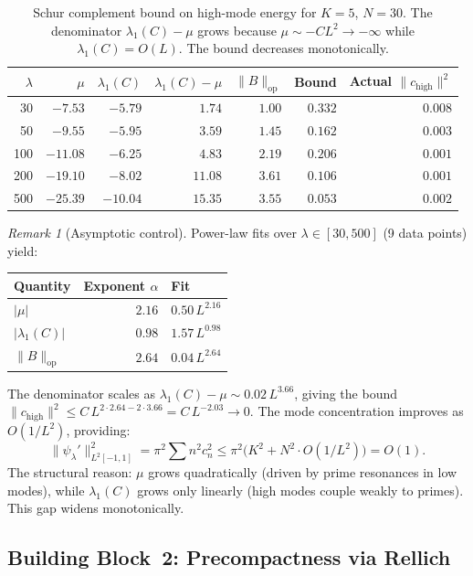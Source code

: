 \documentclass[12pt,a4paper]{article}
\theoremstyle{definition}
\theoremstyle{remark}
\newtheorem{remark}[theorem]{Remark}
\begin{document}
\begin{table}[h]
\centering
\renewcommand{\arraystretch}{1.15}
\begin{tabular}{r|r|r|r|r|r|r}
$\lambda$ & $\mu$ & $\lambda_1(C)$ & $\lambda_1(C) - \mu$ & $\|B\|_{\mathrm{op}}$ & Bound & Actual $\|c_{\mathrm{high}}\|^2$ \\\hline
30  & $-7.53$  & $-5.79$ & $1.74$  & $1.00$ & $0.332$ & $0.008$ \\
50  & $-9.55$  & $-5.95$ & $3.59$  & $1.45$ & $0.162$ & $0.003$ \\
100 & $-11.08$ & $-6.25$ & $4.83$  & $2.19$ & $0.206$ & $0.001$ \\
200 & $-19.10$ & $-8.02$ & $11.08$ & $3.61$ & $0.106$ & $0.001$ \\
500 & $-25.39$ & $-10.04$ & $15.35$ & $3.55$ & $0.053$ & $0.002$
\end{tabular}
\caption{Schur complement bound on high-mode energy for $K = 5$, $N = 30$. The denominator $\lambda_1(C) - \mu$ grows because $\mu \sim -CL^2 \to -\infty$ while $\lambda_1(C) = O(L)$. The bound decreases monotonically.}
\label{tab:schur}
\end{table}

\begin{remark}[Asymptotic control]
Power-law fits over $\lambda \in [30, 500]$ (9 data points) yield:
\begin{center}
\begin{tabular}{l|r|l}
Quantity & Exponent $\alpha$ & Fit \\\hline
$|\mu|$ & $2.16$ & $0.50\,L^{2.16}$ \\
$|\lambda_1(C)|$ & $0.98$ & $1.57\,L^{0.98}$ \\
$\|B\|_{\mathrm{op}}$ & $2.64$ & $0.04\,L^{2.64}$
\end{tabular}
\end{center}
The denominator scales as $\lambda_1(C) - \mu \sim 0.02\,L^{3.66}$, giving the bound $\|c_{\mathrm{high}}\|^2 \leq C\,L^{2 \cdot 2.64 - 2 \cdot 3.66} = C\,L^{-2.03} \to 0$. The mode concentration improves as $O(1/L^2)$, providing:
\[
  \|\psi_\lambda'\|_{L^2[-1,1]}^2 = \pi^2 \sum n^2 c_n^2 \leq \pi^2\bigl(K^2 + N^2 \cdot O(1/L^2)\bigr) = O(1).
\]
The structural reason: $\mu$ grows quadratically (driven by prime resonances in low modes), while $\lambda_1(C)$ grows only linearly (high modes couple weakly to primes). This gap widens monotonically.
\end{remark}

\subsection{Building Block~2: Precompactness via Rellich}
\end{document}
